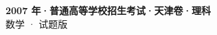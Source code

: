 \documentclass[zihao=-4, a4paper]{ctexart}
\begin{document}
\begin{center}
  {\Large\bfseries 2007 年·普通高等学校招生考试·天津卷·理科}\\[4pt]
  {\large 数学 · 试题版}
\end{center}
\medskip
{}

\end{document}
